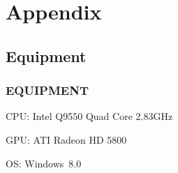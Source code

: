 \section{Appendix}

\subsection{Equipment}
\begin{frame}
\frametitle{EQUIPMENT}

\begin{block}{CPU:}
Intel Q9550 Quad Core $2.83$GHz
\end{block}

\begin{block}{GPU:}
ATI Radeon HD 5800
\end{block}

\begin{block}{OS:}
Windows~8.0
\end{block}

\end{frame}

